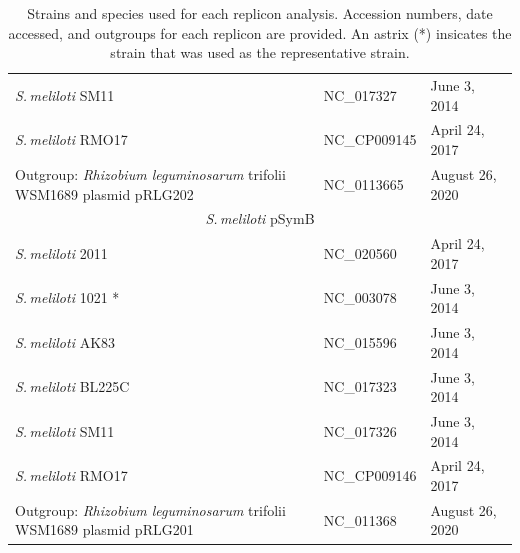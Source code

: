 \documentclass[11pt]{article}
\newcommand{\smel}{\textit{S.\,meliloti}\xspace}
\newcommand{\agrot}{\textit{Agrobacterium tumefaciens}\xspace}
\newcommand{\rleg}{\textit{Rhizobium leguminosarum}\xspace} %
\providecommand{\DIFaddendFL}{} %
\begin{document}
\begin{table}[H]
{\begin{minipage}{\textwidth}
\begin{tabular}{lll}
				\smel SM11 & NC\_017327 & June 3, 2014\\
				\smel RMO17 & NC\_CP009145& April 24, 2017\\
				Outgroup: \rleg trifolii WSM1689 plasmid pRLG202 & NC\_0113665 & August 26, 2020\\
				\midrule
				\multicolumn{3}{c}{\smel pSymB} \\
				\midrule
				\smel 2011 & NC\_020560 & April 24, 2017\\
				\smel 1021 * & NC\_003078 & June 3, 2014\\
				\smel AK83 & NC\_015596 & June 3, 2014\\
				\smel BL225C & NC\_017323 & June 3, 2014\\
				\smel SM11 & NC\_017326 & June 3, 2014\\
				\smel RMO17 & NC\_CP009146 & April 24, 2017\\
				Outgroup: \rleg trifolii WSM1689 plasmid pRLG201 & NC\_011368 & August 26, 2020\\

				\bottomrule

				
			\end{tabular}
			\caption{\label{tab:seqdata} Strains and species used for each replicon analysis. Accession numbers, date accessed, and outgroups for each replicon are provided. An astrix (*) insicates the strain that was used as the representative strain.}
		\end{minipage}}
	\DIFaddendFL \end{table}	
\end{document}
